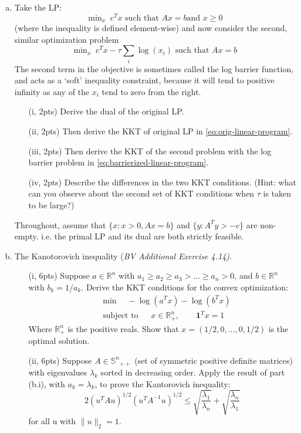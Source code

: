 \documentclass{article}
\theoremstyle{remark}
\theoremstyle{definition}
\newcommand{\st}{\mathop{\mathrm{subject\,\,to}}}
\def\R{\mathbb{R}}
\begin{document}
\begin{enumerate}[(a)]
  \item  Take the LP:
    \begin{equation}\label{eq:orig-linear-program}
      \text{min}_x \;\; c^Tx \text{ such that } Ax=b \text{
        and } x \ge 0
    \end{equation}
    (where the inequality is defined element-wise) and now consider the second,
    similar optimization problem
    \begin{equation}\label{eq:barrierized-linear-program}
      \text{min}_x\;\; c^Tx - {\tau} \sum_i \log (x_i) \text{ such that } Ax=b
    \end{equation}
    The second term in the objective is sometimes called the log barrier
    function, and acts as a `soft' inequality constraint, because it will tend
    to positive infinity as any of the $x_i$ tend to zero from the right.
    \begin{enumerate}
\item[(i, 2pts)] Derive the dual of the original LP.
\item[(ii, 2pts)] Then derive the KKT of original LP in    \eqref{eq:orig-linear-program}.
\item[(iii, 2pts)] Then derive the KKT of the second problem with the log barrier problem
    in \eqref{eq:barrierized-linear-program}.  
\item[(iv, 2pts)] Describe the differences in the two KKT conditions. (Hint: what can you
    observe about the second set of KKT conditions when $\tau$ is taken to be
    large?)  
    \end{enumerate}

    Throughout, assume that $\{x: x>0, Ax=b\}$ and $\{y:{ A^Ty > -c}\}$ are
    non-empty. i.e. the primal LP and its dual are both strictly feasible.

\item The Kanotorovich inequality (\emph{BV Additional Exercise 4.14)}.
\begin{enumerate}[(i)]
\item[(i, 6pts)] Suppose $a \in \R^n$ with $a_1 \geq a_2 \geq a_3 > ... \geq a_n > 0$, and $b \in \R^n$ with $b_k = 1/a_k$. Derive the KKT conditions for the convex optimization: 
\begin{align*}
    &\min \quad -\log(a^Tx) -\log(b^Tx) \\
    &\st\quad\; x \in \R^n_{+}, \qquad \textbf{1}^Tx = 1
\end{align*}
Where $\R^n_{+}$ is the positive reals. Show that $x = (1/2, 0, ...,0, 1/2)$ is the optimal solution.

\item[(ii, 6pts)] Suppose $A \in {\mathbb{S}^n}_{++}$ (set of symmetric positive definite matrices) with eigenvalues $\lambda_k$ sorted in decreasing order. Apply the result of part (b.i), with $a_k = \lambda_k$, to prove the Kantorovich inequality:
$$2(u^TAu)^{1/2} (u^TA^{-1}u)^{1/2} \leq \sqrt{\frac{\lambda_1}{\lambda_n}} + \sqrt{\frac{\lambda_n}{\lambda_1}}  $$
for all u with $\|u\|_2 = 1$.

\end{enumerate}
\end{enumerate}
\end{document}
